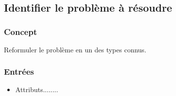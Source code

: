 \subsection{Identifier le problème à résoudre}
\subsubsection{Concept}
Reformuler le problème en un des types connus.

\subsubsection{Entrées}
\begin{itemize}
    \item Attributs........
\end{itemize}

\newpage



